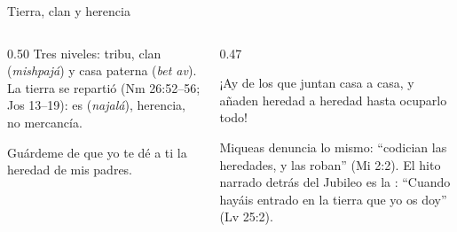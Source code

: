 \begin{frame}{Tierra, clan y herencia}
\begin{columns}[c,onlytextwidth]
\begin{column}{0.50\textwidth}
\small\RaggedRight Tres niveles: tribu, clan (\emph{mishpajá}) y casa paterna (\emph{bet av}). La tierra se repartió  (Nm 26:52--56; Jos 13--19): es  (\emph{najalá}), herencia, no mercancía.\par\medskip
\begin{cita}Guárdeme \SENOR{} de que yo te dé a ti la heredad de mis padres.\end{cita}
\end{column}
\begin{column}{0.47\textwidth}
\begin{cita}¡Ay de los que juntan casa a casa, y añaden heredad a heredad hasta ocuparlo todo!\end{cita}
\scriptsize\RaggedRight Miqueas denuncia lo mismo: ``codician las heredades, y las roban'' (Mi 2:2). El hito narrado detrás del Jubileo es la : ``Cuando hayáis entrado en la tierra que yo os doy'' (Lv 25:2).
\end{column}
\end{columns}
\end{frame}

